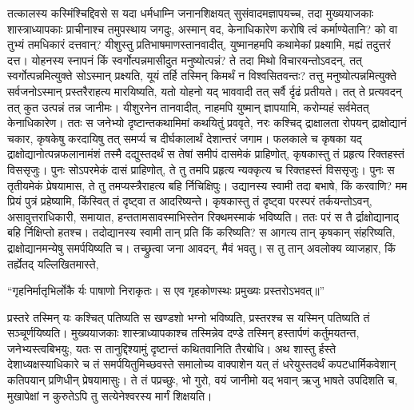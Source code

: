 \adhyAya
{}
\vakya तत्कालस्य कस्मिंश्चिद्दिवसे स यदा धर्मधाम्नि जनानशिक्षयत् सुसंवादमज्ञापयच्च, तदा मुख्ययाजकाः शास्त्राध्यापकाः प्राचीनाश्च तमुपस्थाय जगदुः,
\vakya अस्मान् वद, केनाधिकारेण करोषि त्वं कर्माण्येतानि? को वा तुभ्यं तमधिकारं दत्तवान्?
\vakya यीशुस्तु प्रतिभाषमाणस्तानवादीत्, युष्मानहमपि कथामेकां प्रक्ष्यामि, मह्यं तदुत्तरं दत्त।
\vakya योहनस्य स्नापनं किं स्वर्गोत्पन्नमासीदुत मनुष्योत्पन्नं?
\vakya ते तदा मिथो विचारयन्तोऽवदन्, तत् स्वर्गोत्पन्नमित्युक्ते सोऽस्मान् प्रक्ष्यति, यूयं तर्हि तस्मिन् किमर्थं न विश्वसितवन्तः?
\vakya तत्तु मनुष्योत्पन्नमित्युक्ते सर्वजनोऽस्मान् प्रस्तरैराहत्य मारयिष्यति, यतो योहनो यद् भाववादी तत् सर्वै र्दृढं प्रतीयते।
\vakya तत् ते प्रत्यवदन् तत् कुत उत्पन्नं तन्न जानीमः।
\vakya यीशुरनेन तानवादीत्, नाहमपि युष्मान् ज्ञापयामि, करोम्यहं सर्वमेतत् केनाधिकारेण।
\vakya ततः स जनेभ्यो दृष्टान्तकथामिमां कथयितुं प्रववृते, नरः कश्चिद् द्राक्षालता रोपयन् द्राक्षोद्यानं चकार, कृषकेषु करदायिषु तत् समर्प्य च दीर्घकालार्थं देशान्तरं जगाम।
\vakya फलकाले च कृषका यद् द्राक्षोद्यानोत्पन्नफलानामंशं तस्मै दद्युस्तदर्थं स तेषां समीपं दासमेकं प्राहिणोत्, कृषकास्तु तं प्रहृत्य रिक्तहस्तं विससृजुः।
\vakya पुनः सोऽपरमेकं दासं प्राहिणोत्, ते तु तमपि प्रहृत्य न्यक्कृत्य च रिक्तहस्तं विससृजुः।
\vakya पुनः स तृतीयमेकं प्रेषयामास, ते तु तमप्यस्त्रैराहत्य बहि र्निचिक्षिपुः।
\vakya उद्यानस्य स्वामी तदा बभाषे, किं करवाणि? मम प्रियं पुत्रं प्रहेष्यामि, किंस्वित् तं दृष्ट्वा त आदरिष्यन्ते।
\vakya कृषकास्तु तं दृष्ट्वा परस्परं तर्कयन्तोऽवन्, असावुत्तराधिकारी, समायात, हन्ततामसावस्माभिस्तेन रिक्थमस्माकं भविष्यति।
\vakya ततः परं स तै र्द्राक्षोद्यानाद् बहि र्निक्षिप्तो हतश्च। तदोद्यानस्य स्वामी तान् प्रति किं करिष्यति?
\vakya स आगत्य तान् कृषकान् संहरिष्यति, द्राक्षोद्यानमन्येषु समर्पयिष्यति च।
\vakya तच्छ्रुत्वा जना आवदन्, मैवं भवतु। स तु तान् अवलोक्य व्याजहार, किं तर्ह्येतद् यल्लिखितमास्ते,
\begin{poem}
\startwithline “गृहनिर्मातृभिर्लोकै र्यः पाषाणो निराकृतः।
\pline स एव गृहकोणस्थः प्रमुख्यः प्रस्तरोऽभवत्॥”
\end{poem}
\vakya प्रस्तरे तस्मिन् यः कश्चित् पतिष्यति स खण्डशो भग्नो भविष्यति, प्रस्तरश्च स यस्मिन् पतिष्यति तं सञ्चूर्णयिष्यति।
\vakya मुख्ययाजकाः शास्त्राध्यापकाश्च तस्मिन्नेव दण्डे तस्मिन् हस्तार्पणं कर्तुमयतन्त, जनेभ्यस्त्वबिभयुः, यतः स तानुद्दिश्यामुं दृष्टान्तं कथितवानिति तैरबोधि।
\vakya अथ शास्तु र्हस्ते देशाध्यक्षस्याधिकारे च तं समर्पयितुमिच्छवस्ते समालोच्य वाक्पाशेन यत् तं धरेयुस्तदर्थं कपटधार्मिकवेशान् कतिपयान् प्रणिधीन् प्रेषयामासुः।
\vakya ते तं पप्रच्छुः, भो गुरो, वयं जानीमो यद् भवान् ऋजु भाषते उपदिशति च, मुखापेक्षां न कुरुतेऽपि तु सत्येनेश्वरस्य मार्गं शिक्षयति।
